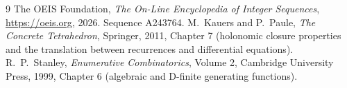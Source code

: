 \documentclass[11pt,a4paper]{article}
\theoremstyle{plain}
\theoremstyle{definition}
\begin{document}
\begin{thebibliography}{9}
 The OEIS Foundation, \emph{The On-Line Encyclopedia of Integer Sequences},
\url{https://oeis.org}, 2026. Sequence A243764.
 M.~Kauers and P.~Paule, \emph{The Concrete Tetrahedron}, Springer, 2011,
Chapter 7 (holonomic closure properties and the translation between recurrences and
differential equations).
 R.~P.~Stanley, \emph{Enumerative Combinatorics}, Volume 2, Cambridge
University Press, 1999, Chapter 6 (algebraic and D-finite generating functions).
\end{thebibliography}
\end{document}
